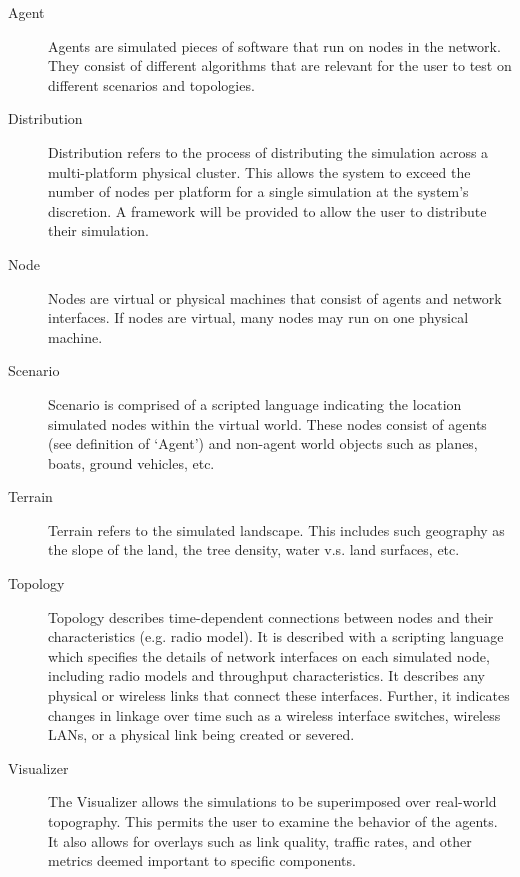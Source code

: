 \documentclass[titlepage]{article}
\begin{document}
\begin{description}
\item[Agent]
	Agents are simulated pieces of software that run on nodes in the network. They consist of different algorithms that are relevant for the user to test on different scenarios and topologies.   

\item[Distribution]
	Distribution refers to the process of distributing the simulation across a multi-platform physical cluster.  This allows the system to exceed the number of nodes per platform for a single simulation at the system's discretion.  A framework will be provided to allow the user to distribute their simulation. 	

\item[Node]
	Nodes are virtual or physical machines that consist of agents and network interfaces.  If nodes are virtual, many nodes may run on one physical machine.  

\item[Scenario]
	Scenario is comprised of a scripted language indicating the location simulated nodes within the virtual world. These nodes consist of agents (see definition of `Agent') and non-agent world objects such as planes, boats, ground vehicles, etc. 

\item[Terrain]
	Terrain refers to the simulated landscape.  This includes such geography as the slope of the land, the tree density, water v.s. land surfaces, etc.

\item[Topology]
	Topology describes time-dependent connections between nodes and their characteristics (e.g. radio model). It is described with a scripting language which specifies the details of network interfaces on each simulated node, including radio models and throughput characteristics.  It describes any physical or wireless links that connect these interfaces.  Further, it indicates changes in linkage over time such as a wireless interface switches, wireless LANs, or a physical link being created or severed. 

\item[Visualizer]
	The Visualizer allows the simulations to be superimposed over real-world topography.  This permits the user to examine the behavior of the agents.  It also allows for overlays such as link quality, traffic rates, and other metrics deemed important to specific components.

\end{description}
\end{document}
